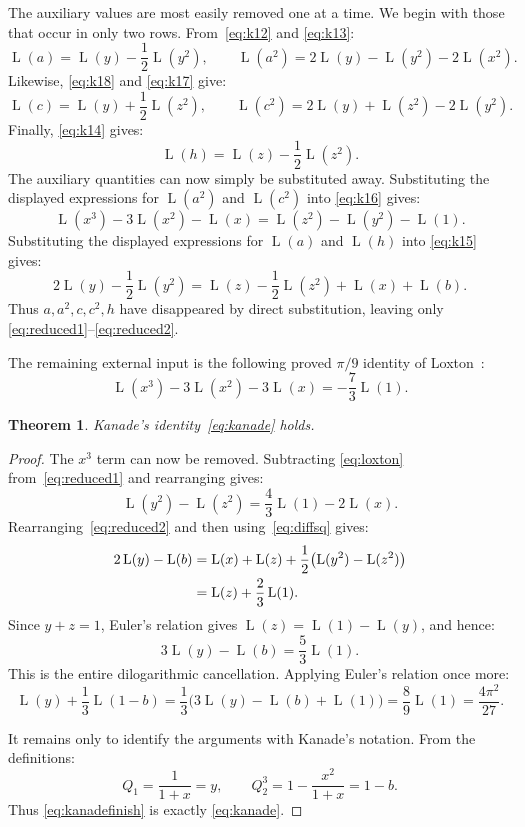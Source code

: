 \documentclass[preprint,12pt,number]{elsarticle}
\newtheorem{theorem}{Theorem}
\theoremstyle{remark}
\newcommand{\Lr}{\operatorname{L}}
\begin{document}
The auxiliary values are most easily removed one at a time.  We begin with
those that occur in only two rows.  From~\eqref{eq:k12} and
\eqref{eq:k13}:
\[
\Lr(a)=\Lr(y)-\frac12\Lr(y^2),
\qquad
\Lr(a^2)=2\Lr(y)-\Lr(y^2)-2\Lr(x^2).
\]
Likewise, \eqref{eq:k18} and \eqref{eq:k17} give:
\[
\Lr(c)=\Lr(y)+\frac12\Lr(z^2),
\qquad
\Lr(c^2)=2\Lr(y)+\Lr(z^2)-2\Lr(y^2).
\]
Finally, \eqref{eq:k14} gives:
\[
\Lr(h)=\Lr(z)-\frac12\Lr(z^2).
\]
The auxiliary quantities can now simply be substituted away.  Substituting
the displayed expressions for $\Lr(a^2)$ and $\Lr(c^2)$ into
\eqref{eq:k16} gives:
\begin{equation}\label{eq:reduced1}
\Lr(x^3)-3\Lr(x^2)-\Lr(x)
=\Lr(z^2)-\Lr(y^2)-\Lr(1).
\end{equation}
Substituting the displayed expressions for $\Lr(a)$ and $\Lr(h)$ into
\eqref{eq:k15} gives:
\begin{equation}\label{eq:reduced2}
2\Lr(y)-\frac12\Lr(y^2)
=\Lr(z)-\frac12\Lr(z^2)+\Lr(x)+\Lr(b).
\end{equation}
Thus $a,a^2,c,c^2,h$ have disappeared by direct substitution, leaving only
\eqref{eq:reduced1}--\eqref{eq:reduced2}.

The remaining external input is the following proved $\pi/9$ identity of
Loxton~\cite{Loxton,Lewin}:
\begin{equation}\label{eq:loxton}
\Lr(x^3)-3\Lr(x^2)-3\Lr(x)=-\frac73\Lr(1).
\end{equation}
\begin{theorem}\label{thm:kanade}
Kanade's identity~\eqref{eq:kanade} holds.
\end{theorem}

\begin{proof}
The $x^3$ term can now be removed.  Subtracting
\eqref{eq:loxton} from~\eqref{eq:reduced1} and rearranging gives:
\begin{equation}\label{eq:diffsq}
\Lr(y^2)-\Lr(z^2)=\frac43\Lr(1)-2\Lr(x).
\end{equation}
Rearranging~\eqref{eq:reduced2} and then using~\eqref{eq:diffsq} gives:
\begin{align}
2\Lr(y)-\Lr(b)
&=\Lr(x)+\Lr(z)+\frac12\bigl(\Lr(y^2)-\Lr(z^2)\bigr)\notag\\
&=\Lr(z)+\frac23\Lr(1).\label{eq:intermediate}
\end{align}
Since $y+z=1$, Euler's relation gives $\Lr(z)=\Lr(1)-\Lr(y)$, and hence:
\begin{equation}\label{eq:keykanade}
3\Lr(y)-\Lr(b)=\frac53\Lr(1).
\end{equation}
This is the entire dilogarithmic cancellation.  Applying Euler's relation
once more:
\begin{equation}\label{eq:kanadefinish}
\Lr(y)+\frac13\Lr(1-b)
 =\frac13\bigl(3\Lr(y)-\Lr(b)+\Lr(1)\bigr)
 =\frac89\Lr(1)=\frac{4\pi^2}{27}.
\end{equation}

It remains only to identify the arguments with Kanade's notation.  From
the definitions:
\[
Q_1=\frac{1}{1+x}=y,
\qquad
Q_2^3=1-\frac{x^2}{1+x}=1-b.
\]
Thus \eqref{eq:kanadefinish} is exactly \eqref{eq:kanade}.
\end{proof}
\end{document}

